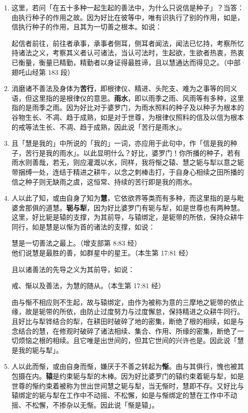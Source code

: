 \begin{enumerate}
\item 这里，若问「在五十多种一起生起的善法中，为什么只说信是种子」？当答：由执行种子的作用之故。因为好比在彼等中，唯有识执行了别的作用，如是，信执行种子的作用，且其为一切善之根本。如说：\begin{quoting}起信者前往，前往者承事，承事者侧耳，侧耳者闻法，闻法已忆持，考察所忆持诸法之义，考察其义者认可诸法，当认可法时，生起欲，生欲者热衷，热衷已衡量，衡量已精勤，精勤者以身证得最胜谛，且以慧通达而得见之。（中部·翅吒山经第 183 段）\end{quoting}
\item 消磨诸不善法及身体为\textbf{苦行}，即根律仪、精进、头陀支、难为之事等的同义语，但这里指的是根律仪的意思。\textbf{雨水}，即以雨季之雨、风雨等有多种，这里指的是雨季之雨。因为好比对于婆罗门，为雨水照料的种子及以种子为根本的谷物生长、不凋、趋于成熟，如是对于世尊，为根律仪照料的信及以信为根本的戒等法生长、不凋、趋于成熟，因此说「苦行是雨水」。
\item 且「慧是我的」中所说的「我的」一词，亦应用于此句中，作「信是我的种子，苦行是我的雨水」。以此显明什么？好比，婆罗门！你所播的种子，若有雨水则善哉，若无，则应灌溉以水，同样，我将惭之辕、慧之轭与犁以意之轭带捆缚一处，连结于精进之耕牛，以念之刺棒击打，于自身心相续之田所播的信之种子则无缺雨之虞，这恒常、持续的苦行即是我的雨水。
\item 人以此了知，或由自身了知为\textbf{慧}，它依欲界等类而有多种，而这里指的是与毗婆舍那俱的道慧。\textbf{轭与犁}，因为好比婆罗门有轭与犁，如是世尊也有两种慧。这里，好比轭是辕的支撑，为其前导，与辕绑定，是轭带的所依，保持众耕牛同行，如是慧是以惭为首的诸法的支撑，如说：\begin{quoting}慧是一切善法之最上。（增支部第 8:83 经）\\他们说慧是最胜的善，如群星中的星王。（本生第 17:81 经）\end{quoting}且以诸善法的先导之义为其前导，如说：\begin{quoting}戒、惭以及善法，为慧的随从。（本生第 17:81 经）\end{quoting}由与惭不相应则不生起，故与辕绑定，由作为被称为意的三摩地之轭带的依止缘，故是轭带的所依，由防止过度努力与过度懈怠，保持精进之众耕牛同行。且好比与犁铧结合的犁，在耕田时破碎了地的密集，断绝了根的相续，如是与念结合的慧，在修观时破碎了诸法相续、集合、作用、所缘的密集，断绝了一切烦恼之根的相续。且它唯是出世间的，但其它世间的兴许也是。因此说「慧是我的轭与犁」。
\item 人以此而惭，或由自身而惭，嫌厌于不善之转起为\textbf{惭}。由与其俱行，愧也被其包摄在内。\textbf{辕}是约束轭与犁的木棒。因为好比婆罗门的辕约束着轭与犁，如是世尊的惭约束着被称为世出世间慧之轭与犁，当无惭时，慧即不存。又好比与辕绑定的轭与犁在工作中不动摇、不松懈，如是与惭绑定的慧在工作中不动摇、不松懈，不掺杂以无惭。因此说「惭是辕」。

\end{enumerate}
